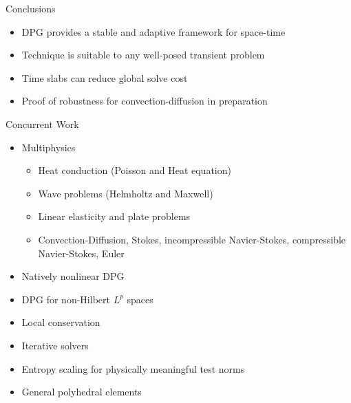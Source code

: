 \documentclass[final]{beamer}
\newlength{\onecolwid}
\begin{document}
\begin{frame}[t]
\begin{columns}[t]
\begin{column}{\onecolwid}


\begin{block}{Conclusions}
\begin{itemize}
\item DPG provides a stable and adaptive framework for space-time
\item Technique is suitable to any well-posed transient problem
\item Time slabs can reduce global solve cost
\item Proof of robustness for convection-diffusion in preparation
\end{itemize}
\end{block}

\begin{block}{Concurrent Work}
\begin{itemize}
\item Multiphysics
\begin{itemize}
  \item Heat conduction (Poisson and Heat equation)
  \item Wave problems (Helmholtz and Maxwell)
  \item Linear elasticity and plate problems
  \item Convection-Diffusion, Stokes, incompressible Navier-Stokes, compressible Navier-Stokes, Euler
\end{itemize}
\item Natively nonlinear DPG
\item DPG for non-Hilbert $L^p$ spaces
\item Local conservation
\item Iterative solvers
\item Entropy scaling for physically meaningful test norms
\item General polyhedral elements
\end{itemize}



\end{block}
\end{column}
\end{columns}
\end{frame}
\end{document}
